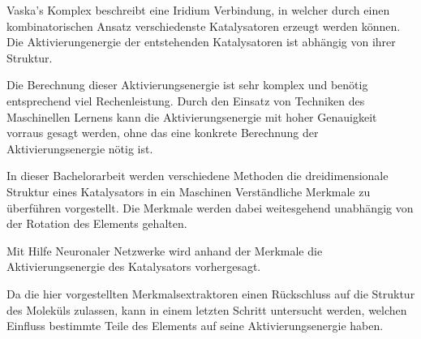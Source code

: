 
\Abstract

Vaska's Komplex beschreibt eine Iridium Verbindung, in welcher durch einen kombinatorischen Ansatz 
verschiedenste Katalysatoren erzeugt werden können.
Die Aktivierungenergie der entstehenden Katalysatoren ist abhängig von ihrer Struktur. 

Die Berechnung dieser Aktivierungsenergie ist sehr komplex und benötig entsprechend viel Rechenleistung.
Durch den Einsatz von Techniken des Maschinellen Lernens kann die Aktivierungsenergie mit hoher Genauigkeit vorraus gesagt werden,
ohne das eine konkrete Berechnung der Aktivierungsenergie nötig ist.

In dieser Bachelorarbeit werden verschiedene Methoden die dreidimensionale Struktur eines Katalysators in ein Maschinen Verständliche
Merkmale zu überführen vorgestellt.
Die Merkmale werden dabei weitesgehend unabhängig von der Rotation des Elements gehalten.

Mit Hilfe Neuronaler Netzwerke wird anhand der Merkmale die Aktivierungsenergie des Katalysators vorhergesagt.

Da die hier vorgestellten Merkmalsextraktoren einen Rückschluss auf die Struktur des Moleküls zulassen, kann in einem letzten Schritt untersucht werden,
welchen Einfluss bestimmte Teile des Elements auf seine Aktivierungsenergie haben.


